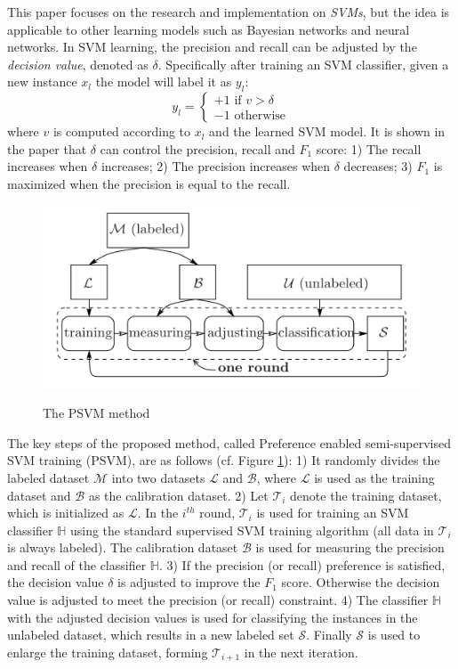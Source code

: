\documentclass[paper=a4, fontsize=18pt]{article} %
\numberwithin{equation}{section} %
\numberwithin{figure}{section} %
\numberwithin{table}{section} %
\newcommand{\mM}{\mathcal{M}}
\newcommand{\mL}{\mathcal{L}}
\newcommand{\mB}{\mathcal{B}}
\newcommand{\mT}{\mathcal{T}}
\newcommand{\mS}{\mathcal{S}}
\newcommand{\bH}{\mathbb{H}}
\begin{document}
This paper focuses on the research and implementation on \emph{SVMs}, but the idea is applicable to other learning models such as Bayesian networks and neural networks.
In SVM learning, the precision and recall can be adjusted by the \emph{decision value}, denoted as $\delta$. Specifically after training an SVM classifier, given a new instance $x_l$ the model will label it as $y_l$:
$$
y_l =
\begin{cases}
+1 \mbox{ if } v > \delta\\
-1 \mbox{ otherwise}
\end{cases}
$$
where $v$ is computed according to $x_l$ and the learned SVM model. It is shown in the paper that $\delta$ can control the precision, recall and $F_1$ score: 1) The recall increases when $\delta$ increases; 2) The precision increases when $\delta$ decreases; 3) $F_1$ is maximized when the precision is equal to the recall.

\begin{figure}[h]
  \centering
  \includegraphics[width=.6\linewidth]{8_8_psvm.png}\\
  \caption{The PSVM method}\label{fig:psvm}
\end{figure}


The key steps of the proposed method, called Preference enabled semi-supervised SVM training (PSVM), are as follows (cf. Figure \ref{fig:psvm}): 1) It randomly divides the labeled dataset $\mM$ into two datasets $\mL$ and $\mB$, where $\mL$ is used as the training dataset and $\mB$ as the calibration dataset. 2) Let $\mT_i$ denote the training dataset, which is initialized as $\mL$. In the $i^{th}$ round, $\mT_i$ is used for training an SVM classifier $\bH$ using the standard supervised SVM training algorithm (all data in $\mT_i$ is always labeled). The calibration dataset $\mB$ is used for measuring the precision and recall of the classifier $\bH$. 3) If the precision (or recall) preference is satisfied, the decision value $\delta$ is adjusted to improve the $F_1$ score. Otherwise the decision value is adjusted to meet the precision (or recall) constraint. 4) The classifier $\bH$ with the adjusted decision values is used for classifying the instances in the unlabeled dataset, which results in a new labeled set $\mS$. Finally $\mS$ is used to enlarge the training dataset, forming $\mT_{i+1}$ in the next iteration.
\end{document}
